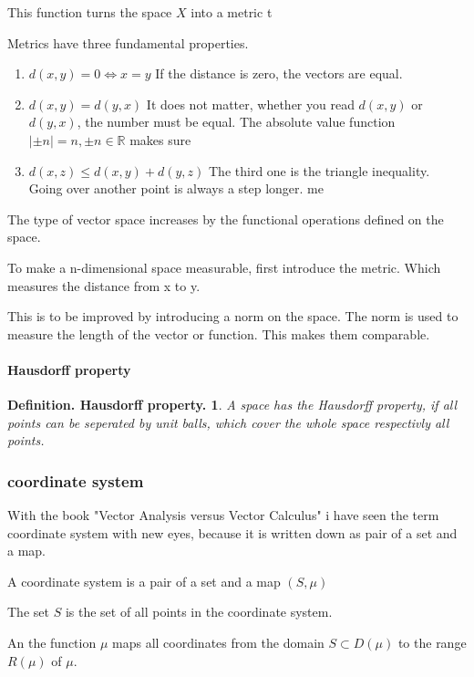 \documentclass[a4paper]{article}
\begin{document}
This function turns the space $X$ into a metric t

Metrics have three fundamental properties.

\begin{enumerate}
\item $d(x,y) = 0 \iff x = y$ If the distance is zero, the vectors are equal.
\item $d(x,y) = d(y,x)$ It does not matter, whether you read $d(x,y)$ or $d(y,x)$, the number must be equal. The absolute value function $|\pm n| = n, \pm n \in \mathbb{R}$ makes sure
\item $d(x,z) \leq d(x,y) + d(y,z)$ The third one is the triangle inequality. Going over another point is always a step longer.
me\end{enumerate}

The type of vector space increases by the functional operations defined on the space.

To make a n-dimensional space measurable, first introduce the metric. Which measures the distance from x to y.


This is to be improved by introducing a norm on the space. The norm is used to measure the length of the vector or function. This makes them comparable.


\paragraph{Hausdorff property}

\newtheorem{hausdorff}{Definition. Hausdorff property.}
\begin{hausdorff}
A space has the Hausdorff property, if all points can be seperated by unit balls, which cover the whole space respectivly all points.
\end{hausdorff}

\subsubsection{coordinate system}

With the book "Vector Analysis versus Vector Calculus" i have seen the term coordinate system with new eyes, because it is written down as pair of a set and a map. 

A coordinate system is a pair of a set and a map $(S, \mu)$

The set $S$  is the set of all points in the coordinate system.

An the function $\mu$ maps all coordinates from the domain $S \subset D(\mu)$ to the range $R(\mu)$ of $\mu$.
\end{document}
